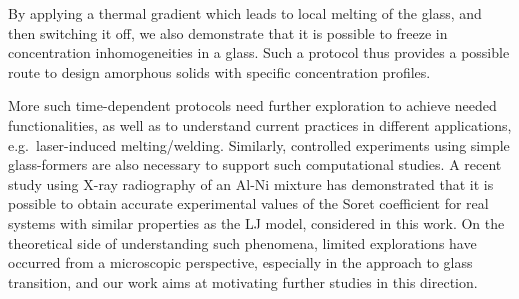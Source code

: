 By applying a thermal gradient which leads to local melting of the glass, and then switching it off, we also demonstrate that it is possible to freeze in {concentration inhomogeneities} in a glass.  Such a protocol thus provides a possible route to design amorphous solids with specific concentration profiles.  

More such time-dependent protocols need further exploration to achieve needed functionalities, as well as to understand current practices in different applications, e.g.~laser-induced melting/welding. Similarly, controlled experiments using simple glass-formers are also necessary to support such computational studies.  {A recent study using X-ray radiography of an Al-Ni mixture \cite{sondermann2019} has demonstrated that it is possible to obtain  accurate experimental values of the Soret coefficient for real systems with similar properties as the LJ model, considered in this work.} On the theoretical side of understanding such phenomena, limited explorations have occurred from a microscopic perspective, especially in the approach to glass transition, and our work aims at motivating further studies in this direction.